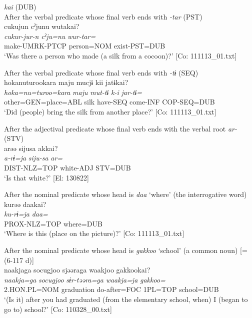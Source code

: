 \ea\label{ex:10.49}   \textit{kai} (DUB)\\
  \ea After the verbal predicate whose final verb ends with \textit{{}-tar} (PST)\\
      \glll    cukujun  cˀjunu  wutakai?\\
    \textit{cukur-jur-n}  \textit{cˀju=nu}  \textit{wur-tar=}\\
    make-UMRK-PTCP  person=NOM  exist-PST=DUB\\
\glt     ‘Was there a person who made (a silk from a cocoon)?’  [Co: 111113\_01.txt]

  \ex After the verbal predicate whose final verb ends with \textit{{}-tɨ} (SEQ)\\
      \glll    {\textbar}hoka{\textbar}nuturookara  maju  mucjɨ  kii  jatɨkai?\\
    \textit{hoka=nu=turoo=kara}  \textit{maju}  \textit{mut-tɨ}  \textit{k-i}  \textit{jar-tɨ=}\\
    other=GEN=place=ABL  silk  have-SEQ  come-INF  COP-SEQ=DUB\\
\glt     ‘Did (people) bring the silk from another place?’  [Co: 111113\_01.txt]

  \ex After the adjectival predicate whose final verb ends with the verbal root \textit{ar-} (STV)\\
      \glll    arəə  sijusa  akkai?\\
    \textit{a-rɨ=ja}  \textit{siju-sa}  \textit{ar=}\\
    DIST-NLZ=TOP  white-ADJ  STV=DUB\\
    \glt     ‘Is that white?’ [El: 130822]

  \ex After the nominal predicate whose head is \textit{daa} ‘where’ (the interrogative word)\\
      \glll    kurəə  daakai?\\
    \textit{ku-rɨ=ja}  \textit{daa=}\\
    PROX-NLZ=TOP  where=DUB\\
\glt     ‘Where is this (place on the picture)?’  [Co: 111113\_01.txt]

  \ex After the nominal predicate whose head is \textit{gakkoo} ‘school’ (a common noun) [= (6-117 d)]\\
      \glll    naakjaga  {\textbar}socugjoo{\textbar}  sjəəraga  waakjoo  {\textbar}gakkoo{\textbar}kai?\\
    \textit{naakja=ga}  \textit{socugjoo}  \textit{sɨr-təəra=ga}  \textit{waakja=ja}  \textit{gakkoo=}\\
    2.HON.PL=NOM  graduation  do-after=FOC  1PL=TOP  school=DUB\\
    \glt     ‘(Is it) after you had graduated (from the elementary school, when) I (began to go to) school?’  [Co: 110328\_00.txt]
    \z
\z

